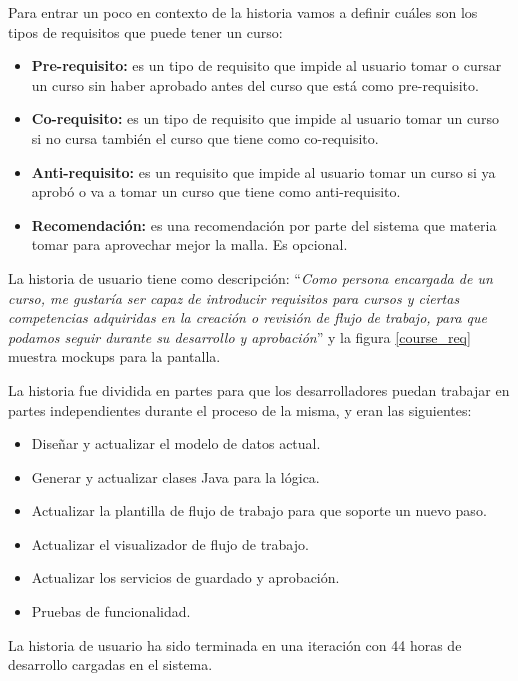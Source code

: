 Para entrar un poco en contexto de la historia vamos a definir cuáles son los tipos de requisitos que puede tener un curso:

\begin{itemize}
	\item \textbf{Pre-requisito:} es un tipo de requisito que impide al usuario tomar o cursar un curso sin haber aprobado antes del curso que está como pre-requisito.
	\item \textbf{Co-requisito:} es un tipo de requisito que impide al usuario tomar un curso si no cursa también el curso que tiene como co-requisito.
	\item \textbf{Anti-requisito:} es un requisito que impide al usuario tomar un curso si ya aprobó o va a tomar un curso que tiene como anti-requisito.
	\item \textbf{Recomendación:} es una recomendación por parte del sistema que materia tomar para aprovechar mejor la malla. Es opcional.
\end{itemize}

La historia de usuario tiene como descripción: \enquote{\textit{Como persona encargada de un curso, me gustaría ser capaz de introducir requisitos para cursos y ciertas competencias adquiridas en la creación o revisión de flujo de trabajo, para que podamos seguir durante su desarrollo y aprobación}} y la figura \ref{course_req} muestra mockups para la pantalla.

La historia fue dividida en partes para que los desarrolladores puedan trabajar en partes independientes durante el proceso de la misma, y eran las siguientes:
\begin{itemize}
	\item Diseñar y actualizar el modelo de datos actual.
	\item Generar y actualizar clases Java para la lógica.
	\item Actualizar la plantilla de flujo de trabajo para que soporte un nuevo paso.
	\item Actualizar el visualizador de flujo de trabajo.
	\item Actualizar los servicios de guardado y aprobación.
	\item Pruebas de funcionalidad.
\end{itemize}

La historia de usuario ha sido terminada en una iteración con 44 horas de desarrollo cargadas en el sistema.

